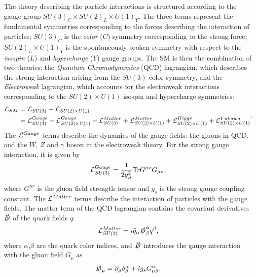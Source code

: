 The theory describing the particle interactions is structured
according to the gauge group $SU(3)_C\times{}SU(2)_L\times{}U(1)_Y$. The three
terms represent the fundamental symmetries corresponding to the forces describing the
interaction of particles: $SU(3)_C$ is the {\it color} ($C$) symmetry corresponding
to the strong force; $SU(2)_L\times{}U(1)_Y$ is the spontaneously
broken symmetry with respect to the {\it isospin} ($L$)
and {\it hypercharge} ($Y$) gauge groups.
The SM is then the combination of two theories: the {\it Quantum
  Chromodynamics} (QCD) lagrangian, which describes the strong
interaction arising from the $SU(3)$ color symmetry, and the {\it
  Electroweak} lagrangian, which accounts for the electroweak
interactions corresponding to the $SU(2)\times{}U(1)$ isospin and
hypercharge symmetries:
\begin{equation}
\begin{split}
\mathcal{L}{}_{SM}  & = \mathcal{L}{}_{SU(3)} + \mathcal{L}{}_{SU(2)\times{}U(1)} \\
& = \mathcal{L}{}_{SU(3)}^{Gauge} 
+ \mathcal{L}{}_{SU(2)\times{}U(1)}^{Gauge} 
+ \mathcal{L}{}_{SU(3)}^{Matter}
+ \mathcal{L}{}_{SU(2)\times{}U(1)}^{Matter}
+ \mathcal{L}{}_{SU(2)\times{}U(1)}^{Higgs} +
\mathcal{L}{}_{SU(2)\times{}U(1)}^{Yukawa} \\
\end{split}
.
\end{equation}
The $\mathcal{L}{}^{Gauge}$ terms describe the dynamics of the gauge fields:
the gluons in QCD, and the $W$, $Z$ and $\gamma$ boson in the
electroweak theory.
For the strong gauge interaction, it is given by
\begin{equation}
\mathcal{L}{}_{SU(3)}^{Gauge} = \frac{1}{2g_S^2}\mathrm{Tr}G^{\mu\nu}G_{\mu\nu},
\end{equation}
where $G^{\mu\nu}$ is the gluon field strength tensor and $g_s$ is the
strong gauge coupling constant.
The $\mathcal{L}{}^{Matter}$ terms describe the interaction of particles
with the gauge fields. The matter term of the QCD lagrangian contains
the covariant derivatives $\slashed{D}$ of the quark fields $q$:
\begin{equation}
\mathcal{L}{}_{SU(3)}^{Matter}=i\bar{q}_\alpha \slashed{D}^\alpha_\beta
q^\beta ,
\end{equation}
where $\alpha$,$\beta$ are the quark color indices, and $\slashed{D}$
introduces the gauge interaction with the gluon field $G_\mu$ as
\begin{equation}
\slashed{D}_\mu = \partial_\mu \delta^\alpha_\beta + ig_sG_{\mu
  \beta}^\alpha .
\end{equation}
